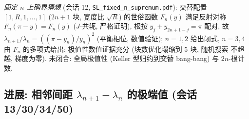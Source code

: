 \documentclass[UTF8]{ctexart}
\begin{document}
\emph{固定 $n$ 上确界猜想} (会话 12, \texttt{SL\_fixed\_n\_supremum.pdf}):
交替配置 $[1,R,1,\dots,1]$ ($2n+1$ 块, 宽度比 $\sqrt R$) 的世俗函数
$F_n(y)$ 满足反射对称 $F_n(\pi-y)=F_n(y)$ ($J$-共轭, 严格证明), 根按
$y_j+y_{2n+1-j}=\pi$ 配对, 故 $\lambda_{n+1}/\lambda_n =
((\pi-y_n)/y_n)^2$ (平衡相位, 数值验证); $n=1,2$ 给出闭式, $n=3,4$ 由
$F_n$ 的多项式给出; 极值性数值证据充分 (块数优化塌缩到 5 块, 随机搜索
不超越, 梯度为零). 未闭合: 全局极值性 (Keller 型归约到交替 bang-bang)
与 $2n$-根计数.

\subsection{\texorpdfstring{进展: 相邻间距 $\lambda_{n+1}-\lambda_n$ 的极端值 (会话 13/30/34/50)}{进展: 相邻间距 lambda(n+1)-lambda(n) 的极端值 (会话 13/30/34/50)}}
\end{document}
